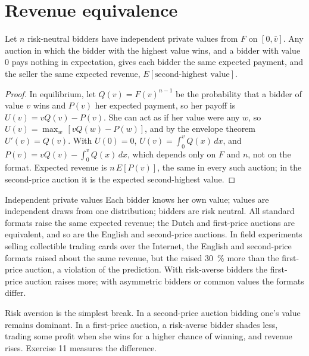 \section{Revenue equivalence}\label{sec:b3:auctions-and-market-design:equivalence}

\begin{proposition}\label{prop:b3:auctions-and-market-design:revenue-equivalence}
Let $n$ risk-neutral bidders have independent private values from $F$ on $[0, \bar v]$. Any auction in
which the bidder with the highest value wins, and a bidder with value 0 pays nothing in
expectation, gives each bidder the same expected payment, and the seller the same
expected revenue, $E[\text{second-highest value}]$.
\end{proposition}

\begin{proof}
In equilibrium, let $Q(v) = F(v)^{n-1}$ be the probability that a bidder of value $v$ wins and $P(v)$ her
expected payment, so her payoff is $U(v) = vQ(v) - P(v)$. She can act as if her value were any $w$, so
$U(v) = \max_w\,[vQ(w) - P(w)]$, and by the envelope theorem $U'(v) = Q(v)$. With $U(0) = 0$, $U(v) = \int_0^v Q(x)\,dx$, and
$P(v) = vQ(v) - \int_0^v Q(x)\,dx$, which depends only on $F$ and $n$, not on the format. Expected revenue is $n\,E[P(v)]$,
the same in every such auction; in the second-price auction it is the expected
second-highest value.
\end{proof}

\begin{model}{Independent private values}
\assumes Each bidder knows her own value; values are independent draws from one
distribution; bidders are risk neutral.
\predicts All standard formats raise the same expected revenue; the Dutch and
first-price auctions are equivalent, and so are the English and second-price
auctions.
\tested In field experiments selling collectible trading cards over the
Internet, the English and second-price formats raised about the same revenue, but
the  raised 30~\% more than the first-price auction, a violation of the
prediction. %
\breaks With risk-averse bidders the first-price auction raises more; with
asymmetric bidders or common values the formats differ.
\end{model}

Risk aversion is the simplest break. In a second-price auction bidding one's value
remains dominant. In a first-price auction, a risk-averse bidder shades less, trading
some profit when she wins for a higher chance of winning, and revenue rises. Exercise 11
measures the difference.

